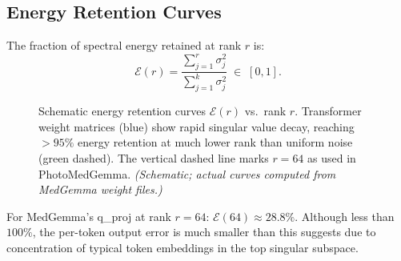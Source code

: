 \documentclass[12pt, a4paper]{article}
\begin{document}
\subsection{Energy Retention Curves}

The fraction of spectral energy retained at rank $r$ is:
\begin{equation}
  \mathcal{E}(r) = \frac{\sum_{j=1}^r \sigma_j^2}{\sum_{j=1}^k \sigma_j^2}
  \;\in\;[0,1].
  \label{eq:energy_retained}
\end{equation}

\begin{figure}[H]
\centering
{}
\caption{%
  Schematic energy retention curves $\mathcal{E}(r)$ vs.\ rank $r$.
  Transformer weight matrices (blue) show rapid singular value decay,
  reaching $>95\%$ energy retention at much lower rank than uniform noise
  (green dashed).
  The vertical dashed line marks $r=64$ as used in PhotoMedGemma.
  \textit{(Schematic; actual curves computed from MedGemma weight files.)}%
}
\label{fig:energy_curves}
\end{figure}

For MedGemma's q\_proj at rank $r=64$: $\mathcal{E}(64) \approx 28.8\%$.
Although less than $100\%$, the per-token output error is much smaller than
this suggests due to concentration of typical token embeddings in the top
singular subspace.
\end{document}
